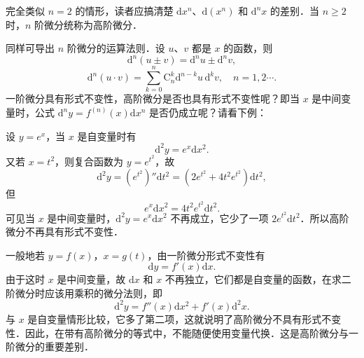 完全类似 $n=2$ 的情形，读者应搞清楚 $\mathrm{d}x^{n}$、$\mathrm{d}(x^{n})$ 和 $\mathrm{d}^{n}x$ 的差别．当 $n\geqslant 2$ 时，$n$ 阶微分统称为高阶微分．

同样可导出 $n$ 阶微分的运算法则．设 $u$、$v$ 都是 $x$ 的函数，则
\[
\mathrm{d}^{n}(u\pm v)=\mathrm{d}^{n}u\pm\mathrm{d}^{n}v,
\]
\[
\mathrm{d}^{n}(u\cdot v)=\sum_{k=0}^{n}\mathrm{C}_{n}^{k}\mathrm{d}^{n-k}u\,\mathrm{d}^{k}v,\quad n=1,2\cdots.
\]
一阶微分具有形式不变性，高阶微分是否也具有形式不变性呢？即当 $x$ 是中间变量时，公式 $\mathrm{d}^{n}y=f^{(n)}(x)\mathrm{d}x^{n}$ 是否仍成立呢？请看下例：

设 $y=e^{x}$，当 $x$ 是自变量时有
\[
\mathrm{d}^{2}y=e^{x}\mathrm{d}x^{2}.
\]
又若 $x=t^{2}$，则复合函数为 $y=e^{t^{2}}$，故
\[
\mathrm{d}^{2}y=\left(e^{t^{2}}\right)''\mathrm{d}t^{2}=\left(2e^{t^{2}}+4t^{2}e^{t^{2}}\right)\mathrm{d}t^{2},
\]
但
\[
e^{x}\mathrm{d}x^{2}=4t^{2}e^{t^{2}}\mathrm{d}t^{2}.
\]
可见当 $x$ 是中间变量时，$\mathrm{d}^{2}y=e^{x}\mathrm{d}x^{2}$ 不再成立，它少了一项 $2e^{t^{2}}\mathrm{d}t^{2}$．所以高阶微分不再具有形式不变性．

一般地若 $y=f(x)$，$x=g(t)$，由一阶微分形式不变性有
\[
\mathrm{d}y=f'(x)\mathrm{d}x.
\]
由于这时 $x$ 是中间变量，故 $\mathrm{d}x$ 和 $x$ 不再独立，它们都是自变量的函数，在求二阶微分时应该用乘积的微分法则，即
\[
\mathrm{d}^{2}y=f''(x)\mathrm{d}x^{2}+f'(x)\mathrm{d}^{2}x.
\]
与 $x$ 是自变量情形比较，它多了第二项，这就说明了高阶微分不具有形式不变性．因此，在带有高阶微分的等式中，不能随便使用变量代换．这是高阶微分与一阶微分的重要差别．

